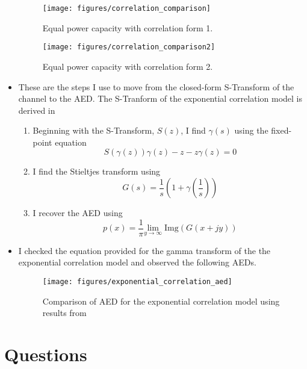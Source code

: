 \documentclass[12pt,a4paper]{report}
\begin{document}
\begin{itemize}
	\begin{figure}[H]
	\texttt{[image: figures/correlation\_comparison]}
	  \caption{Equal power capacity with correlation form 1.}
	\end{figure}
	\begin{figure}[H]
	\texttt{[image: figures/correlation\_comparison2]}
	  \caption{Equal power capacity with correlation form 2.}
\end{figure}
\item
	These are the steps I use to move from the closed-form S-Transform of the channel to the AED.
	The S-Tranform of the exponential correlation model is derived in \cite{skupch2005free}
	\begin{enumerate}
	\item
		Beginning with the S-Transform, $S(z)$, I find $\gamma(s)$ using the fixed-point equation
		\begin{equation}
			S(\gamma(z))\gamma(z) - z - z\gamma(z) = 0 
		\end{equation}
	\item
		I find the Stieltjes transform using
		\begin{equation}
			G(s) = \frac{1}{s} (1+\gamma(\frac{1}{s}))
		\end{equation}			
	\item 
		I recover the AED using 
\begin{equation}
p(x) = \frac{1}{\pi} \underset{y \rightarrow \infty}{\text{lim}} \; \text{Img}(G(x+jy))
\end{equation}
	\end{enumerate}

\item
	I checked the equation provided for the gamma transform of the the exponential correlation model and observed the following AEDs.
		\begin{figure}[H]
	\texttt{[image: figures/exponential\_correlation\_aed]}
	  \caption{Comparison of AED for the exponential correlation model using results from \cite{skupch2005free}}
	\end{figure}

\end{itemize}
\section{Questions}

\end{document}
